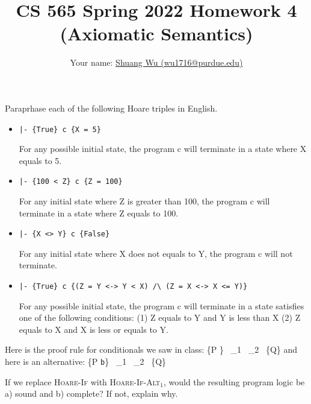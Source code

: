 \documentclass[12pt]{article}
\newenvironment{problem}[2][Problem]{\begin{trivlist}
\item[\hskip \labelsep {\bfseries #1}\hskip \labelsep {\bfseries #2.}]}{\end{trivlist}}
\begin{document}
\title{CS 565 Spring 2022 Homework 4 (Axiomatic Semantics)}
\author{Your name: \underline{Shuang Wu (wu1716@purdue.edu)}}
\maketitle

\begin{problem}{1 (2 points)}
Paraprhase each of the following Hoare triples in English.

\begin{itemize}
\item[a. ]   \lstinline!|- {True} c {X = 5}!

For any possible initial state, the program c will terminate in a state where X equals to 5.

\item[b. ]   \lstinline!|- {100 < Z} c {Z = 100}!

For any initial state where Z is greater than 100, the program c will terminate in a state where Z equals to 100.

\item[c. ]   \lstinline!|- {X <> Y} c {False}!

For any initial state where X does not equals to Y, the program c will not terminate.

\item[d. ]   \lstinline!|- {True} c {(Z = Y <-> Y < X) /\ (Z = X <-> X <= Y)}!

For any possible initial state, the program c will terminate in a state satisfies one of the following conditions: (1) Z equals to Y and Y is less than X (2) Z equals to X and X is less or equals to Y.

\end{itemize}
\end{problem}

\pagebreak

\begin{problem}{2 (1 point)}
  Here is the proof rule for conditionals we saw in class:
  {\vdash \{P \}~ _1~ _2  ~\{Q\}}
  \noindent and here is an alternative:
  {\vdash \{P \land \lstinline|b|\}~ _1~ _2  ~\{Q\}}

  If we replace \textsc{Hoare-If} with \textsc{Hoare-If-Alt$_1$},
  would the resulting program logic be a) sound and b) complete?
  If not,  explain why.
  \end{problem}
  
\end{document}
